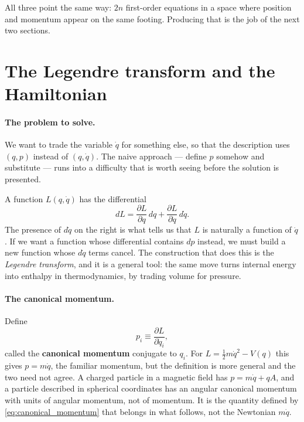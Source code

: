 \documentclass[12pt]{article}
\begin{document}
All three point the same way: $2n$ first-order equations in a space
where position and momentum appear on the same footing.  Producing that
is the job of the next two sections.

\section{The Legendre transform and the Hamiltonian}
\label{sec:legendre}

\paragraph{The problem to solve.}  We want to trade the variable
$\dot q$ for something else, so that the description uses $(q,p)$
instead of $(q,\dot q)$.  The naive approach --- define $p$ somehow and
substitute --- runs into a difficulty that is worth seeing before the
solution is presented.

A function $L(q,\dot q)$ has the differential
%
\begin{equation}
  dL = \frac{\partial L}{\partial q}\,dq
     + \frac{\partial L}{\partial\dot q}\,d\dot q .
  \label{eq:dL}
\end{equation}
%
The presence of $d\dot q$ on the right is what tells us that $L$ is
naturally a function of $\dot q$.  If we want a function whose
differential contains $dp$ instead, we must build a new function whose
$d\dot q$ terms cancel.  The construction that does this is the
\emph{Legendre transform}, and it is a general tool: the same move
turns internal energy into enthalpy in thermodynamics, by trading
volume for pressure.

\paragraph{The canonical momentum.}  Define
%
\begin{equation}
  p_i \equiv \frac{\partial L}{\partial\dot q_i} ,
  \label{eq:canonical_momentum}
\end{equation}
%
called the \textbf{canonical momentum} conjugate to $q_i$.  For
$L = \tfrac12 m\dot q^2 - V(q)$ this gives $p = m\dot q$, the familiar
momentum, but the definition is more general and the two need not
agree.  A charged particle in a magnetic field has
$p = m\dot q + qA$, and a particle described in spherical coordinates
has an angular canonical momentum with units of angular momentum, not
of momentum.  It is the quantity defined by
\eqref{eq:canonical_momentum} that belongs in what follows, not the
Newtonian $m\dot q$.
\end{document}

